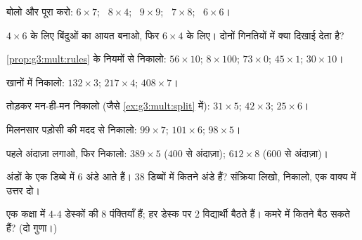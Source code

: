 \begin{exercise}[$\star$]\label{exo:g3:mult:2}
बोलो और पूरा करो: $6 \times 7$; \ $8 \times 4$; \ $9 \times 9$;
\ $7 \times 8$; \ $6 \times 6$।
\end{exercise}

\begin{exercise}[$\star$]\label{exo:g3:mult:3}
$4 \times 6$ के लिए बिंदुओं का आयत बनाओ, फिर $6 \times 4$ के
लिए। दोनों गिनतियों में क्या दिखाई देता है?
\end{exercise}

\begin{exercise}[$\star$]\label{exo:g3:mult:4}
\cref{prop:g3:mult:rules} के नियमों से निकालो:
$56 \times 10$; \quad $8 \times 100$; \quad $73 \times 0$; \quad
$45 \times 1$; \quad $30 \times 10$।
\end{exercise}

\begin{exercise}[$\star$]\label{exo:g3:mult:5}
खानों में निकालो: $132 \times 3$; \quad $217 \times 4$; \quad
$408 \times 7$।
\end{exercise}

\begin{exercise}[$\star$]\label{exo:g3:mult:6}
तोड़कर मन-ही-मन निकालो (जैसे \cref{ex:g3:mult:split} में):
$31 \times 5$; \quad $42 \times 3$; \quad $25 \times 6$।
\end{exercise}

\begin{exercise}[$\star$]\label{exo:g3:mult:7}
मिलनसार पड़ोसी की मदद से निकालो: $99 \times 7$; \quad
$101 \times 6$; \quad $98 \times 5$।
\end{exercise}

\begin{exercise}[$\star$]\label{exo:g3:mult:8}
पहले अंदाज़ा लगाओ, फिर निकालो: $389 \times 5$ ($400$ से अंदाज़ा);
$612 \times 8$ ($600$ से अंदाज़ा)।
\end{exercise}

\begin{exercise}[$\star$]\label{exo:g3:mult:9}
अंडों के एक डिब्बे में $6$ अंडे आते हैं। $38$ डिब्बों में कितने
अंडे हैं? संक्रिया लिखो, निकालो, एक वाक्य में उत्तर दो।
\end{exercise}

\begin{exercise}[$\star\star$]\label{exo:g3:mult:10}
एक कक्षा में $4$-$4$ डेस्कों की $8$ पंक्तियाँ हैं; हर डेस्क पर
$2$ विद्यार्थी बैठते हैं। कमरे में कितने बैठ सकते हैं? (दो गुणा।)
\end{exercise}

